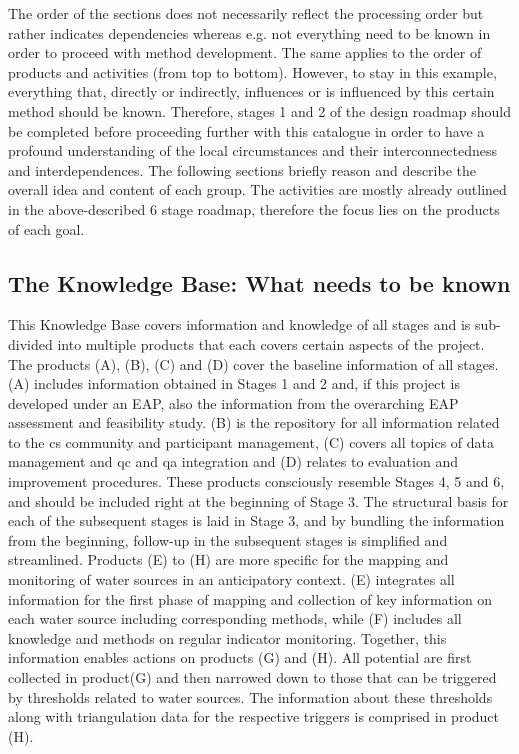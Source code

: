 The order of the sections does not necessarily reflect the processing order but rather indicates dependencies whereas e.g. not everything need to be known in order to proceed with method development. The same applies to the order of products and activities (from top to bottom). However, to stay in this example, everything that, directly or indirectly, influences or is influenced by this certain method should be known. Therefore, stages 1 and 2 of the design roadmap should be completed before proceeding further with this catalogue in order to have a profound understanding of the local circumstances and their interconnectedness and interdependences.\newline
The following sections briefly reason and describe the overall idea and content of each group. The activities are mostly already outlined in the above-described 6 stage roadmap, therefore the focus lies on the products of each goal. 

\subsection{The Knowledge Base: What needs to be known}

This Knowledge Base covers information and knowledge of all stages and is sub-divided into multiple products that each covers certain aspects of the project. 
The products (A), (B), (C) and (D) cover the baseline information of all stages. (A) includes information obtained in Stages 1 and 2 and, if this project is developed under an EAP, also the information from the overarching EAP assessment and feasibility study. (B) is the repository for all information related to the \acrlong{cs} community and participant management, (C) covers all topics of data management and \acrshort{qc} and \acrshort{qa} integration and (D) relates to evaluation and improvement procedures. These products consciously resemble Stages 4, 5 and 6, and should be included right at the beginning of Stage 3. The structural basis for each of the subsequent stages is laid in Stage 3, and by bundling the information from the beginning, follow-up in the subsequent stages is simplified and streamlined.\newline
Products (E) to (H) are more specific for the mapping and monitoring of water sources in an anticipatory context. (E) integrates all information for the first phase of mapping and collection of key information on each water source including corresponding methods, while (F) includes all knowledge and methods on regular indicator monitoring. Together, this information enables actions on products (G) and (H). All potential  are first collected in product(G) and then narrowed down to those that can be triggered by thresholds related to water sources. The information about these thresholds along with triangulation data for the respective triggers is comprised in product (H).

